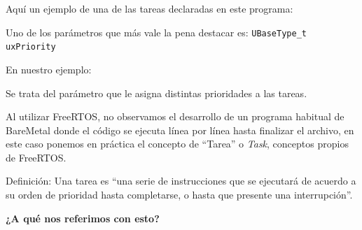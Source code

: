                     
                    
                    Aquí un ejemplo de una de las tareas declaradas en este programa:\par
                    \par

                    Uno de los parámetros que más vale la pena destacar es: \texttt{UBaseType\_t uxPriority}\par
                    En nuestro ejemplo:\par
                    \par
                    Se trata del parámetro que le asigna distintas prioridades a las tareas.\par
                    Al utilizar FreeRTOS, no observamos el desarrollo de un programa habitual de BareMetal donde el código se ejecuta línea por línea hasta finalizar el archivo, en este caso ponemos en práctica el concepto de “Tarea” o \textit{Task}, conceptos propios de FreeRTOS.\par
                    Definición: Una tarea es “una serie de instrucciones que se ejecutará de acuerdo a su orden de prioridad hasta completarse, o hasta que presente una interrupción”.\par
                    \textbf{¿A qué nos referimos con esto?}\par

